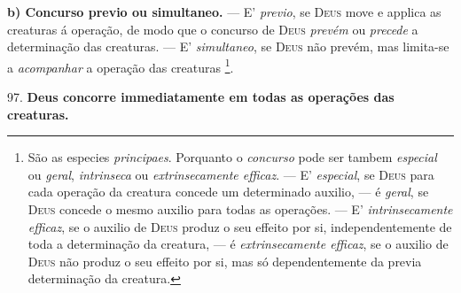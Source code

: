 \textbf{b) Concurso previo ou simultaneo.} --- E' \emph{previo}, se \textsc{Deus} move e applica as creaturas á operação, de modo que o concurso de \textsc{Deus} \emph{prevém} ou \emph{precede} a determinação das creaturas. --- E' \emph{simultaneo}, se \textsc{Deus} não prevém, mas limita-se a \emph{acompanhar} a operação das creaturas \footnote{São as especies \emph{principaes}. Porquanto o \emph{concurso} pode ser tambem \emph{especial} ou \emph{geral}, \emph{intrinseca} ou \emph{extrinsecamente efficaz}. --- E' \emph{especial}, se \textsc{Deus} para cada operação da creatura concede um determinado auxilio, --- é \emph{geral}, se \textsc{Deus} concede o mesmo auxilio para todas as operações. --- E' \emph{intrinsecamente efficaz}, se o auxilio de \textsc{Deus} produz o seu effeito por si, independentemente de toda a determinação da creatura, --- é \emph{extrinsecamente efficaz}, se o auxilio de \textsc{Deus} não produz o seu effeito por si, mas só dependentemente da previa determinação da creatura.}.

 97. \textbf{Deus concorre immediatamente em todas as operações das creaturas.}

